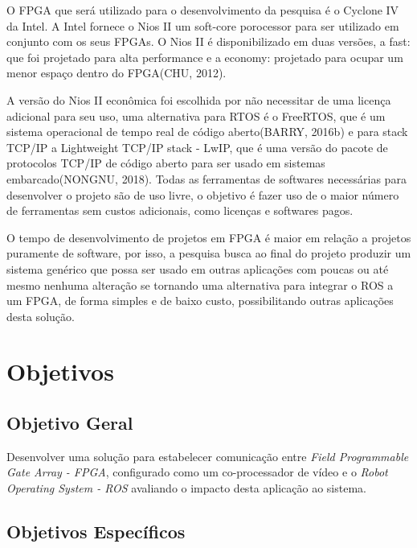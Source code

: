 O FPGA que será utilizado para o desenvolvimento da pesquisa é o Cyclone IV da Intel. A Intel 
fornece o Nios II um soft-core porocessor para ser utilizado em conjunto com os seus FPGAs. 
O Nios II é disponibilizado em duas versões, a fast: que foi projetado para alta performance e 
a economy: projetado para ocupar um menor espaço dentro do FPGA(CHU, 2012).

A versão do Nios II econômica foi escolhida por não necessitar de uma licença adicional para 
seu uso, uma alternativa para RTOS é o FreeRTOS, que é um sistema operacional de tempo real de 
código aberto(BARRY, 2016b) e para stack TCP/IP a Lightweight TCP/IP stack - LwIP, que é uma 
versão do pacote de protocolos TCP/IP de código aberto para ser usado em sistemas 
embarcado(NONGNU, 2018). Todas as ferramentas de softwares necessárias para desenvolver o 
projeto são de uso livre, o objetivo é fazer uso de o maior número de ferramentas sem custos 
adicionais, como licenças e softwares pagos.

O tempo de desenvolvimento de projetos em FPGA é maior em relação a projetos puramente de 
software, por isso, a pesquisa busca ao final do projeto produzir um sistema genérico que possa 
ser usado em outras aplicações com poucas ou até mesmo nenhuma alteração se tornando uma 
alternativa para integrar o ROS a um FPGA, de forma simples e de baixo custo, possibilitando 
outras aplicações desta solução.

\section{Objetivos}

\subsection{Objetivo Geral}

Desenvolver uma solução para estabelecer comunicação entre \textit{Field Programmable Gate Array - FPGA}, 
configurado como um co-processador de vídeo e o  \textit{Robot Operating System - ROS} avaliando 
o impacto desta aplicação ao sistema.

\subsection{Objetivos Específicos}

